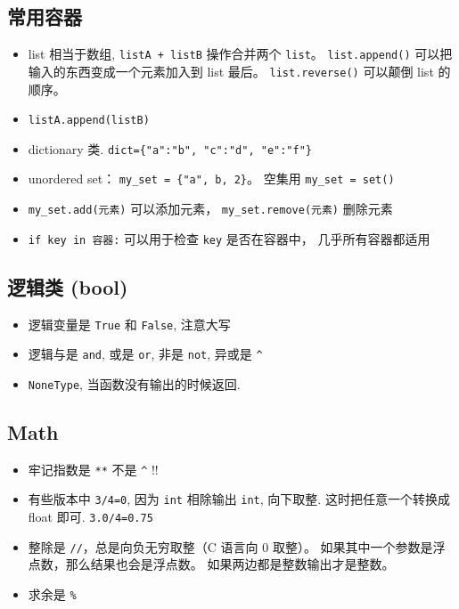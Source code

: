 \subsection{常用容器}
\begin{itemize}
\item list 相当于数组, \verb`listA + listB` 操作合并两个 \verb`list`。 \verb`list.append()` 可以把输入的东西变成一个元素加入到 list 最后。 \verb`list.reverse()` 可以颠倒 list 的顺序。
\item \verb`listA.append(listB)`
\item dictionary 类.  \verb`dict={"a":"b", "c":"d", "e":"f"}`
\item unordered set： \verb`my_set = {"a", b, 2}`。 空集用 \verb`my_set = set()`
\item \verb`my_set.add(元素)` 可以添加元素， \verb`my_set.remove(元素)` 删除元素
\item \verb`if key in 容器:` 可以用于检查 \verb`key` 是否在容器中， 几乎所有容器都适用
\end{itemize}

\subsection{逻辑类 (bool)}
\begin{itemize}
\item 逻辑变量是 \verb`True` 和 \verb`False`, 注意大写
\item 逻辑与是 \verb`and`, 或是 \verb`or`, 非是 \verb`not`, 异或是 \verb`^`
\item \verb`NoneType`, 当函数没有输出的时候返回.
\end{itemize}

\subsection{Math}
\begin{itemize}
\item 牢记指数是 \verb`**` 不是 \verb`^` !!
\item 有些版本中 \verb`3/4=0`, 因为 \verb`int` 相除输出 \verb`int`, 向下取整. 这时把任意一个转换成 float 即可. \verb`3.0/4=0.75`
\item 整除是 \verb`//`，总是向负无穷取整（C 语言向 0 取整）。 如果其中一个参数是浮点数，那么结果也会是浮点数。 如果两边都是整数输出才是整数。
\item 求余是 \verb`%`
\end{itemize}

